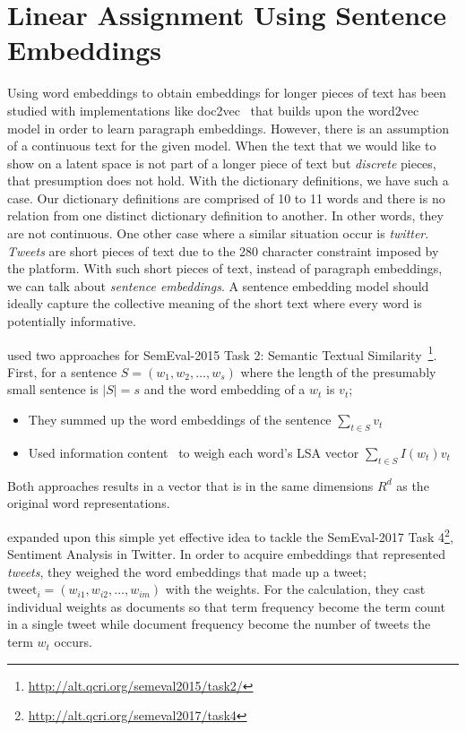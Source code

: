 \section{Linear Assignment Using Sentence Embeddings}%
\label{sec:linear_assignment_using_sentence_embeddings}

Using word embeddings to obtain embeddings for longer pieces of text has been studied with implementations like doc2vec~\cite{le_distributed_2014} that builds upon the word2vec~\cite{mikolov_distributed_2013} model in order to learn paragraph embeddings.
However, there is an assumption of a continuous text for the given model.
When the text that we would like to show on a latent space is not part of a longer piece of text but \emph{discrete} pieces, that presumption does not hold.
With the dictionary definitions, we have such a case.
Our dictionary definitions are comprised of 10 to 11 words and there is no relation from one distinct dictionary definition to another.
In other words, they are not continuous.
One other case where a similar situation occur is \emph{twitter}.
\emph{Tweets} are short pieces of text due to the 280 character constraint imposed by the platform.
With such short pieces of text, instead of paragraph embeddings, we can talk about \emph{sentence embeddings}.
A sentence embedding model should ideally capture the collective meaning of the short text where every word is potentially informative.

\textcite{zhao_ecnu_2015} used two approaches for SemEval-2015 Task 2: Semantic Textual Similarity~\footnote{\url{http://alt.qcri.org/semeval2015/task2/}}.
First, for a sentence $S = (w_{1}, w_{2}, \dots, w_{s})$ where the length of the presumably small sentence is $|S| = s$ and the word embedding of a $w_t$ is $v_t$;
\begin{itemize}
    \item They summed up the word embeddings of the sentence $\sum_{t \in S}v_{t}$
    \item Used information content~\cite{saric_takelab_2012} to weigh each word's LSA vector $\sum_{t \in S} I(w_t) v_{t}$
\end{itemize}
Both approaches results in a vector that is in the same dimensions $R^{d}$ as the original word representations.

\textcite{edilson_a._correa_nilc-usp_2017} expanded upon this simple yet effective idea to tackle the SemEval-2017 Task 4\footnote{\url{http://alt.qcri.org/semeval2017/task4}}, Sentiment Analysis in Twitter.
In order to acquire embeddings that represented \emph{tweets}, they weighed the word embeddings that made up a tweet; $\text{tweet}_i = (w_{i1}, w_{i2}, \dots, w_{im})$ with the \tfidf{} weights.
For the \tfidf{} calculation, they cast individual weights as documents so that term frequency become the term count in a single tweet while document frequency become the number of tweets the term $w_t$ occurs.

